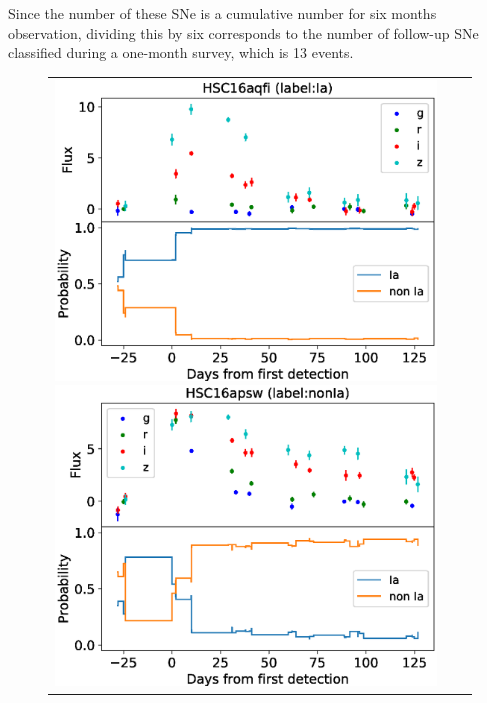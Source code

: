 \documentclass[useamsfonts]{pasj01}
\begin{document}
Since the number of these SNe is a cumulative number for six months observation, dividing this by six corresponds to the number of follow-up SNe classified during a one-month survey, which is 13 events.
%
\begin{figure}[htbp]
    \begin{tabular}{ccc}
        \begin{minipage}{0.33\hsize}
            \begin{center}
                \includegraphics[width=\columnwidth]{figures/lcp_aqfi.eps}
            \end{center}
        \end{minipage}
        \begin{minipage}{0.33\hsize}
            \begin{center}
                \includegraphics[width=\columnwidth]{figures/lcp_apsw.eps}

\end{center}
\end{minipage}
\end{tabular}
\end{figure}
\end{document}
